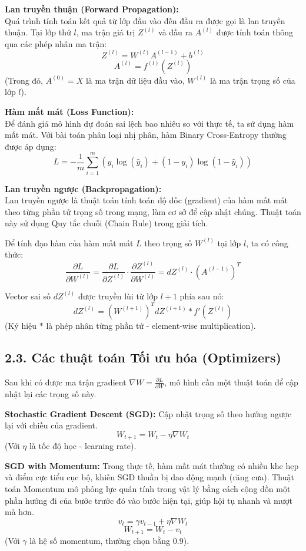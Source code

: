 \documentclass[13pt,a4paper]{article}
\begin{document}
\textbf{Lan truyền thuận (Forward Propagation):} \\
Quá trình tính toán kết quả từ lớp đầu vào đến đầu ra được gọi là lan truyền thuận. Tại lớp thứ $l$, ma trận giá trị $Z^{(l)}$ và đầu ra $A^{(l)}$ được tính toán thông qua các phép nhân ma trận:
\[
Z^{(l)} = W^{(l)} A^{(l-1)} + b^{(l)}
\]
\[
A^{(l)} = f^{(l)}(Z^{(l)})
\]
(Trong đó, $A^{(0)} = X$ là ma trận dữ liệu đầu vào, $W^{(l)}$ là ma trận trọng số của lớp $l$).

\textbf{Hàm mất mát (Loss Function):} \\
Để đánh giá mô hình dự đoán sai lệch bao nhiêu so với thực tế, ta sử dụng hàm mất mát. Với bài toán phân loại nhị phân, hàm Binary Cross-Entropy thường được áp dụng:
\[
L = -\frac{1}{m} \sum_{i=1}^{m} \left( y_i \log(\hat{y}_i) + (1 - y_i) \log(1 - \hat{y}_i) \right)
\]

\textbf{Lan truyền ngược (Backpropagation):} \\
Lan truyền ngược là thuật toán tính toán độ dốc (gradient) của hàm mất mát theo từng phần tử trọng số trong mạng, làm cơ sở để cập nhật chúng. Thuật toán này sử dụng Quy tắc chuỗi (Chain Rule) trong giải tích.

Để tính đạo hàm của hàm mất mát $L$ theo trọng số $W^{(l)}$ tại lớp $l$, ta có công thức:
\[
\frac{\partial L}{\partial W^{(l)}} = \frac{\partial L}{\partial Z^{(l)}} \cdot \frac{\partial Z^{(l)}}{\partial W^{(l)}} = dZ^{(l)} \cdot (A^{(l-1)})^T
\]

Vector sai số $dZ^{(l)}$ được truyền lùi từ lớp $l+1$ phía sau nó:
\[
dZ^{(l)} = (W^{(l+1)})^T dZ^{(l+1)} * f'(Z^{(l)})
\]
(Ký hiệu $*$ là phép nhân từng phần tử - element-wise multiplication).

\subsection*{2.3. Các thuật toán Tối ưu hóa (Optimizers)}
Sau khi có được ma trận gradient $\nabla W = \frac{\partial L}{\partial W}$, mô hình cần một thuật toán để cập nhật lại các trọng số này.

\textbf{Stochastic Gradient Descent (SGD):} Cập nhật trọng số theo hướng ngược lại với chiều của gradient.
\[
W_{t+1} = W_t - \eta \nabla W_t
\]
(Với $\eta$ là tốc độ học - learning rate).

\textbf{SGD with Momentum:} Trong thực tế, hàm mất mát thường có nhiều khe hẹp và điểm cực tiểu cục bộ, khiến SGD thuần bị dao động mạnh (răng cưa). Thuật toán Momentum mô phỏng lực quán tính trong vật lý bằng cách cộng dồn một phần hướng đi của bước trước đó vào bước hiện tại, giúp hội tụ nhanh và mượt mà hơn.
\[
v_t = \gamma v_{t-1} + \eta \nabla W_t
\]
\[
W_{t+1} = W_t - v_t
\]
(Với $\gamma$ là hệ số momentum, thường chọn bằng $0.9$).
\end{document}

